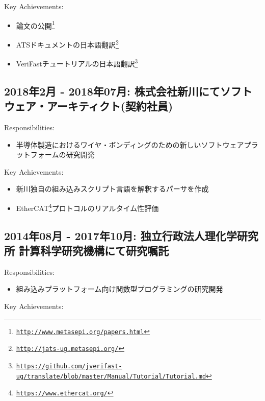 \documentclass[letterpaper]{article}
\begin{document}
Key Achievements:

\begin{itemize}
  \item 論文の公開\footnote{\href{http://www.metasepi.org/papers.html}{\tt http://www.metasepi.org/papers.html}}
  \item ATSドキュメントの日本語翻訳\footnote{\href{http://jats-ug.metasepi.org/}{\tt http://jats-ug.metasepi.org/}}
  \item VeriFastチュートリアルの日本語翻訳\footnote{\href{https://github.com/jverifast-ug/translate/blob/master/Manual/Tutorial/Tutorial.md}{\tt https://github.com/jverifast-ug/translate/blob/master/Manual/Tutorial/Tutorial.md}}
\end{itemize}

\subsection*{2018年2月 - 2018年07月: 株式会社新川にてソフトウェア・アーキティクト(契約社員)}

Responsibilities:

\begin{itemize}
  \item 半導体製造におけるワイヤ・ボンディングのための新しいソフトウェアプラットフォームの研究開発
\end{itemize}

Key Achievements:

\begin{itemize}
  \item 新川独自の組み込みスクリプト言語を解釈するパーサを作成
  \item EtherCAT\footnote{\href{https://www.ethercat.org/}{\tt https://www.ethercat.org/}}プロトコルのリアルタイム性評価
\end{itemize}

\subsection*{2014年08月 - 2017年10月: 独立行政法人理化学研究所 計算科学研究機構にて研究嘱託}

Responsibilities:

\begin{itemize}
  \item 組み込みプラットフォーム向け関数型プログラミングの研究開発
\end{itemize}

Key Achievements:
\end{document}
